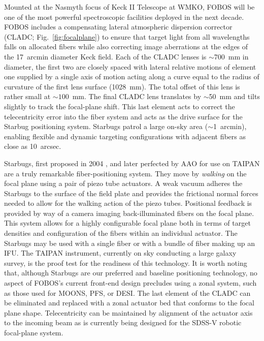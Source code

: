 Mounted at the Nasmyth focus of Keck II Telescope at WMKO, FOBOS will
be one of the most powerful spectroscopic facilities deployed in the
next decade. FOBOS includes a compensating lateral atmospheric
dispersion corrector (CLADC; Fig.~\ref{fig:focalplane}) to ensure
that target light from all wavelengths falls on allocated fibers
while also correcting image aberrations at the edges of the 17~arcmin
diameter Keck field. Each of the CLADC lenses is $\sim$700~mm in
diameter, the first two are closely spaced with lateral relative
motions of element one supplied by a single axis of motion acting
along a curve equal to the radius of curvature of the first lens
surface (1028~mm). The total offset of this lens is rather small at
$\sim1$00~mm. The final CLADC lens translates by $\sim$50~mm and
tilts slightly to track the focal-plane shift. This last element acts to
correct the telecentricity error into the fiber system and acts as the
drive surface for the Starbug positioning system.
Starbugs patrol a large on-sky area ($\sim$1~arcmin), enabling
flexible and dynamic targeting configurations with adjacent fibers as
close as 10~arcsec.


Starbugs, first proposed in 2004 \citep{2004SPIE.5495..600M}, and
later perfected by AAO for use on TAIPAN \citep{2016SPIE.9912E..1WS}
are a truly remarkable fiber-positioning system. They move by {\it
walking} on the focal plane using a pair of piezo tube actuators. A
weak vacuum adheres the Starbugs to the surface of the field plate
and provides the frictional normal forces needed to allow for the
walking action of the piezo tubes. Positional feedback is provided by
way of a camera imaging back-illuminated fibers on the focal plane.
This system allows for a highly configurable focal plane both in
terms of target densities and configuration of the fibers within an
individual actuator. The Starbugs may be used with a single fiber or
with a bundle of fiber making up an IFU. The TAIPAN instrument,
currently on sky conducting a large galaxy survey, is the proof test
for the readiness of this technology. It is worth noting that,
although Starbugs are our preferred and baseline positioning
technology, no aspect of FOBOS's current front-end design precludes
using a zonal system, such as those used for MOONS, PFS, or DESI. The
last element of the CLADC can be eliminated and replaced with a zonal
actuator bed that conforms to the focal plane shape. Telecentricity
can be maintained by alignment of the actuator axis to the incoming
beam as is currently being designed for the SDSS-V robotic
focal-plane system.

